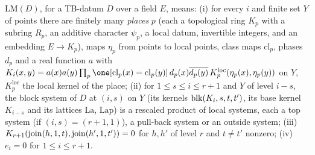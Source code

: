 \begin{definition}\label{pf:thmS:localmodel}
$\mathrm{LM}(D)$, for a TB-datum $D$ over a field $E$, means: (i) for every $i$ and finite set $Y$ of points
there are finitely many \emph{places} $p$ (each a topological ring $K_p$ with a subring $R_p$, an additive character
$\psi_p$, a local datum, invertible integers, and an embedding $E\to K_p$), maps $\eta_p$ from points to local points,
class maps $\mathrm{cl}_p$, phases $d_p$ and a real function $a$ with
$K_i(x,y)=a(x)a(y)\prod_p\one[\mathrm{cl}_p(x)=\mathrm{cl}_p(y)]\,d_p(x)\overline{d_p(y)}\,K^{\mathrm{loc}}_p(\eta_p(x),\eta_p(y))$
on $Y$, $K^{\mathrm{loc}}_p$ the local kernel of the place; (ii) for $1\le s\le i\le r+1$ and $Y$ of level $i-s$, the block
system of $D$ at $(i,s)$ on $Y$ (its kernels $\operatorname{blk}(K_i,s,t,t')$, its base kernel $K_{i-s}$ and its lattices
$\mathrm{La}$, $\mathrm{Lap}$) is a rescaled product of local systems, each a top system (if $(i,s)=(r+1,1)$), a
pull-back system or an outside system; (iii) $K_{r+1}(\operatorname{join}(h,1,t),\operatorname{join}(h',1,t'))=0$ for $h,h'$ of level $r$ and
$t\ne t'$ nonzero; (iv) $e_i=0$ for $1\le i\le r+1$.
\end{definition}


